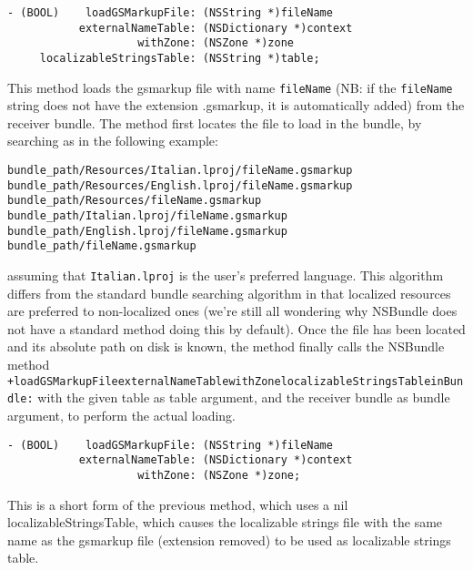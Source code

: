 \begin{verbatim}
- (BOOL)    loadGSMarkupFile: (NSString *)fileName
           externalNameTable: (NSDictionary *)context
                    withZone: (NSZone *)zone
     localizableStringsTable: (NSString *)table;
\end{verbatim}
This method loads the gsmarkup file with name \texttt{fileName} (NB: if
the \texttt{fileName} string does not have the extension .gsmarkup, it is
automatically added) from the receiver bundle.  The method first
locates the file to load in the bundle, by searching as in the
following example:
\begin{verbatim}
bundle_path/Resources/Italian.lproj/fileName.gsmarkup
bundle_path/Resources/English.lproj/fileName.gsmarkup
bundle_path/Resources/fileName.gsmarkup
bundle_path/Italian.lproj/fileName.gsmarkup
bundle_path/English.lproj/fileName.gsmarkup
bundle_path/fileName.gsmarkup
\end{verbatim}
assuming that \texttt{Italian.lproj} is the user's preferred language.
This algorithm differs from the standard bundle searching algorithm in
that localized resources are preferred to non-localized ones (we're
still all wondering why NSBundle does not have a standard method doing
this by default).  Once the file has been located and its absolute
path on disk is known, the method finally calls the NSBundle method
\texttt{+loadGSMarkupFile\discretionary{:}{}{:}externalNameTable\discretionary{:}{}{:}withZone\discretionary{:}{}{:}localizableStringsTable\discretionary{:}{}{:}inBundle:} 
with the given table as table argument, and the receiver bundle as
bundle argument, to perform the actual loading.

\begin{verbatim}
- (BOOL)    loadGSMarkupFile: (NSString *)fileName
           externalNameTable: (NSDictionary *)context
                    withZone: (NSZone *)zone;
\end{verbatim}
This is a short form of the previous method, which uses a nil
localizableStringsTable, which causes the localizable strings file
with the same name as the gsmarkup file (extension removed) to be used as
localizable strings table.

